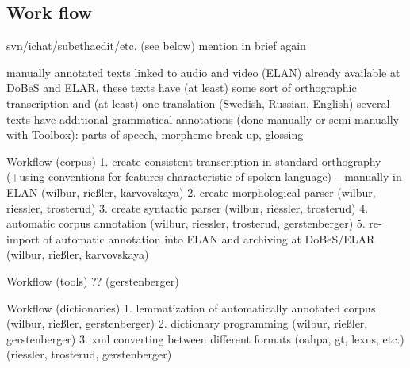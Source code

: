 \documentclass[a4paper,12pt]{article}
\begin{document}
\subsection{Work flow}%
svn/ichat/subethaedit/etc. (see below) mention in brief again

manually annotated texts linked to audio and video (ELAN) already available at DoBeS and ELAR, these texts have (at least) some sort of orthographic transcription and (at least) one translation (Swedish, Russian, English)
several texts have additional grammatical annotations (done manually or semi-manually with Toolbox): parts-of-speech, morpheme break-up, glossing

Workflow (corpus)
1. create consistent transcription in standard orthography (+using conventions for features characteristic of spoken language) – manually in ELAN (wilbur, rießler, karvovskaya)
2. create morphological parser (wilbur, riessler, trosterud)
3. create syntactic parser (wilbur, riessler, trosterud)
4. automatic corpus annotation (wilbur, riessler, trosterud, gerstenberger)
5. re-import of automatic annotation into ELAN and archiving at DoBeS/ELAR (wilbur, rießler, karvovskaya)

Workflow (tools)
?? (gerstenberger)

Workflow (dictionaries)
1. lemmatization of automatically annotated corpus (wilbur, rießler, gerstenberger)
2. dictionary programming (wilbur, rießler, gerstenberger)
3. xml converting between different formats (oahpa, gt, lexus, etc.) (riessler, trosterud, gerstenberger)

\end{document}
